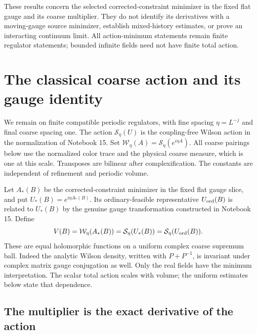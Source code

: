 \documentclass[11pt]{article}
\theoremstyle{remark}
\newcommand{\norm}[1]{\left\|#1\right\|}
\begin{document}
These results concern the selected corrected-constraint minimizer
in the fixed flat gauge and its coarse multiplier. They do not
identify its derivatives with a moving-gauge source minimizer,
establish mixed-history estimates, or prove an interacting
continuum limit. All action-minimum statements remain finite
regulator statements; bounded infinite fields need not have finite
total action.


\section{The classical coarse action and its gauge identity}
\label{ca-section}

We remain on finite compatible periodic regulators, with fine
spacing $\eta=L^{-j}$ and final coarse spacing one. The action
$\mathcal S_\eta(U)$ is the coupling-free Wilson action in the
normalization of Notebook 15. Set
$\mathcal W_\eta(A)=\mathcal S_\eta(e^{i\eta A})$.
All coarse pairings below use the normalized color trace and
the physical coarse measure, which is one at this scale.
Transposes are bilinear after complexification. The constants
are independent of refinement and periodic volume.

Let $A_*(B)$ be the corrected-constraint minimizer in the fixed
flat gauge slice, and put $U_*(B)=e^{i\eta A_*(B)}$. Its
ordinary-feasible representative $U_{\rm ord}(B)$ is related
to $U_*(B)$ by the genuine gauge transformation constructed in
Notebook 15. Define
\begin{equation}\label{ca-definition}
 V(B)=\mathcal W_\eta(A_*(B))
     =\mathcal S_\eta(U_*(B))
     =\mathcal S_\eta(U_{\rm ord}(B)).
\end{equation}
These are equal holomorphic functions on a uniform complex
coarse supremum ball. Indeed the analytic Wilson density,
written with $P+P^{-1}$, is invariant under complex matrix
gauge conjugation as well. Only the real fields have the
minimum interpretation. The scalar total action scales with
volume; the uniform estimates below state that dependence.

\subsection{The multiplier is the exact derivative of the action}
\label{ca-envelope-section}
\end{document}
